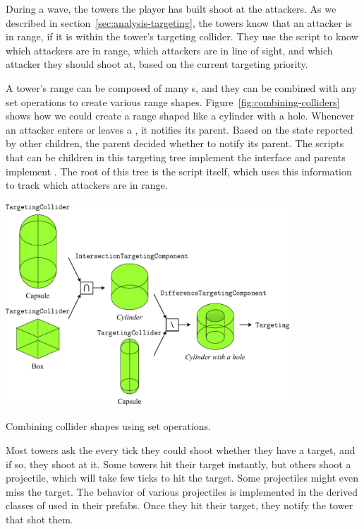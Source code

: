 During a wave, the towers the player has built shoot at the attackers.
As we described in section~\ref{sec:analysis-targeting}, the towers know that an attacker is in range, if it is within the tower's targeting collider.
They use the  script to know which attackers are in range, which attackers are in line of sight, and which attacker they should shoot at, based on the current targeting priority.

A tower's range can be composed of many s, and they can be combined with any set operations to create various range shapes.
Figure~\ref{fig:combining-colliders} shows how we could create a range shaped like a cylinder with a hole.
Whenever an attacker enters or leaves a , it notifies its parent.
Based on the state reported by other children, the parent decided whether to notify its parent.
The scripts that can be children in this targeting tree implement the interface  and parents implement .
The root of this tree is the  script itself, which uses this information to track which attackers are in range.

\begin{center}
    \captionsetup{type=figure}
    \includegraphics[width=0.8\textwidth]{img/combining colliders.pdf}
    \caption{Combining collider shapes using set operations.}
    \label{fig:combining-colliders}
\end{center}

Most towers ask the  every tick they could shoot whether they have a target, and if so, they shoot at it.
Some towers hit their target instantly, but others shoot a projectile, which will take few ticks to hit the target.
Some projectiles might even miss the target.
The behavior of various projectiles is implemented in the derived classes of  used in their prefabs.
Once they hit their target, they notify the tower that shot them.


